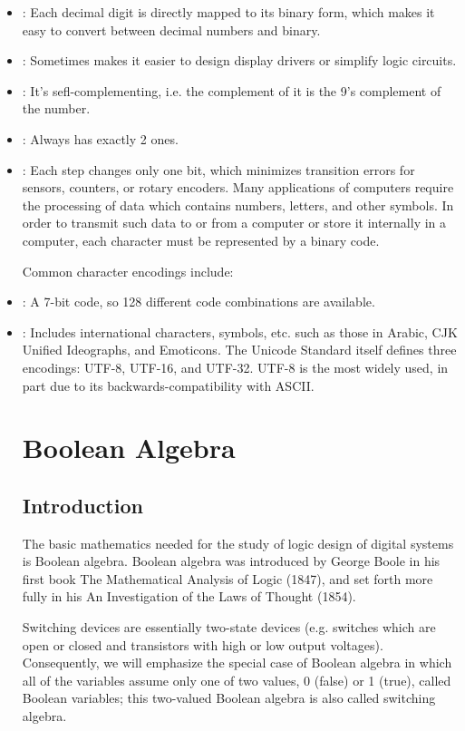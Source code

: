 \documentclass[a4paper,12pt]{report}
\begin{document}
\begin{itemize}
\item{}: Each decimal digit is directly mapped to its binary form, which makes it easy to convert between decimal numbers and binary.
\item{}: Sometimes makes it easier to design display drivers or simplify logic circuits.
\item{}: It's sefl-complementing, i.e. the complement of it is the 9's complement of the number. 
\item{}: Always has exactly 2 ones.
\item{}: Each step changes only one bit, which minimizes transition errors for sensors, counters, or rotary encoders.
\eit
{}
Many applications of computers require the processing of data which contains numbers, letters, and other symbols. In order to transmit such data to or from a computer or store it internally in a computer, each character must be represented by a binary code.

Common character encodings include:
\bit
\item{}: A 7-bit code, so 128 different code combinations are available.
\item{}: Includes international characters, symbols, etc. such as those in Arabic, CJK Unified Ideographs, and Emoticons. The Unicode Standard itself defines three encodings: UTF-8, UTF-16, and UTF-32. UTF-8 is the most widely used, in part due to its backwards-compatibility with ASCII.
\eit
\section{Boolean Algebra}
\subsection{Introduction}
The basic mathematics needed for the study of logic design of digital systems is Boolean algebra. Boolean algebra was introduced by George Boole in his first book The Mathematical Analysis of Logic (1847), and set forth more fully in his An Investigation of the Laws of Thought (1854).

Switching devices are essentially two-state devices (e.g. switches which are open or closed and transistors with high or low output voltages). Consequently, we will emphasize the special case of Boolean algebra in which all of the variables assume only one of two values, 0 (false) or 1 (true), called Boolean variables; this two-valued Boolean algebra is also called switching algebra.


\end{itemize}
\end{document}
